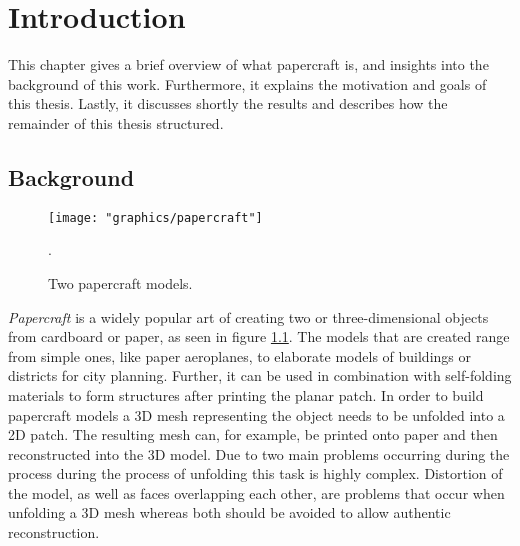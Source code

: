 \documentclass[draft,final]{vutinfth} %
\begin{document}

\tableofcontents %

\mainmatter

\chapter{Introduction}
This chapter gives a brief overview of what papercraft is, and insights into the background of this work. Furthermore, it explains the motivation and goals of this thesis. Lastly, it discusses shortly the results and describes how the remainder of this thesis structured.

\section{Background}

\begin{figure}
    \centering
    \texttt{[image: "graphics/papercraft"]}
    \caption{Two papercraft models.}
    \label{fig:papercraft}.
\end{figure}

\textit{Papercraft} is a widely popular art of creating two or three-dimensional objects from cardboard or paper, as seen in figure \ref{fig:papercraft}. The models that are created range from simple ones, like paper aeroplanes, to elaborate models of buildings or districts for city planning. Further, it can be used in combination with self-folding materials to form structures after printing the planar patch. In order to build papercraft models a 3D mesh representing the object needs to be unfolded into a 2D patch. The resulting mesh can, for example, be printed onto paper and then reconstructed into the 3D model. Due to two main problems occurring during the process during the process of unfolding this task is highly complex. Distortion of the model, as well as faces overlapping each other, are problems that occur when unfolding a 3D mesh whereas both should be avoided to allow authentic reconstruction.
\end{document}
